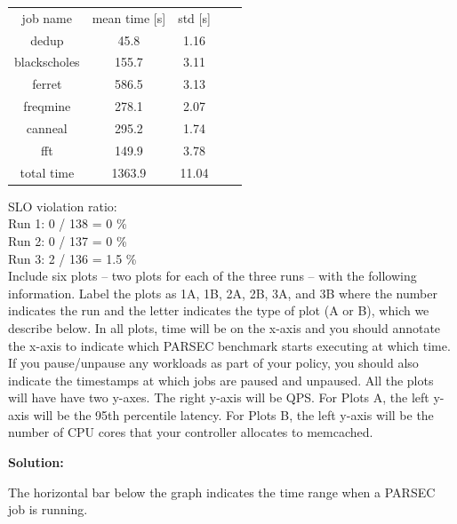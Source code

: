\documentclass[11pt]{article}
\begin{document}
\begin{enumerate}
    \begin{table}[h]
        \centering
        \begin{tabular}{ |c|c|c|c|c|} 
        \hline
        job name & mean time [s] & std [s] \\
        \hhline{|=|=|=|}
        dedup         & 45.8 & 1.16 \\ \hline
        blackscholes  & 155.7 & 3.11 \\ \hline
        ferret        & 586.5 & 3.13 \\ \hline
        freqmine      & 278.1 & 2.07 \\ \hline
        canneal       & 295.2 & 1.74 \\ \hline
        fft           & 149.9 & 3.78 \\ \hline
        total time    & 1363.9 & 11.04 \\ \hline
        \end{tabular}
    \end{table}

    SLO violation ratio: \\
    Run 1: 0 / 138 = 0 \% \\
    Run 2: 0 / 137 = 0 \% \\
    Run 3: 2 / 136 = 1.5 \% \\

   Include six plots -- two plots for each of the three runs -- with the following information. Label the plots as 1A, 1B, 2A, 2B, 3A, and 3B where the number indicates the run and the letter indicates the type of plot (A or B), which we describe below. In all plots, time will be on the x-axis and you should annotate the x-axis to indicate which PARSEC benchmark starts executing at which time. If you pause/unpause any workloads as part of your policy, you should also indicate the timestamps at which jobs are paused and unpaused. All the plots will have have two y-axes. The right y-axis will be QPS. For Plots A, the left y-axis will be the 95th percentile latency. For Plots B, the left y-axis will be the number of CPU cores that your controller allocates to memcached. 

    \textbf{Solution:}
    
    The horizontal bar below the graph indicates the time range when a PARSEC job is running.
    

\end{enumerate}
\end{document}
